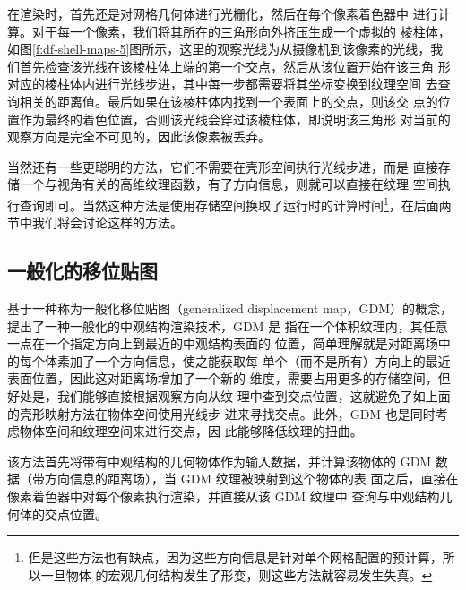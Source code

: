 在渲染时，首先还是对网格几何体进行光栅化，然后在每个像素着色器中 进行计算。对于每一个像素，我们将其所在的三角形向外挤压生成一个虚拟的 棱柱体，如图\ref{f:df-shell-maps-5}图所示，这里的观察光线为从摄像机到该像素的光线，我 们首先检查该光线在该棱柱体上端的第一个交点，然后从该位置开始在该三角 形对应的棱柱体内进行光线步进，其中每一步都需要将其坐标变换到纹理空间 去查询相关的距离值。最后如果在该棱柱体内找到一个表面上的交点，则该交 点的位置作为最终的着色位置，否则该光线会穿过该棱柱体，即说明该三角形 对当前的观察方向是完全不可见的，因此该像素被丢弃。

当然还有一些更聪明的方法，它们不需要在壳形空间执行光线步进，而是 直接存储一个与视角有关的高维纹理函数，有了方向信息，则就可以直接在纹理 空间执行查询即可。当然这种方法是使用存储空间换取了运行时的计算时间\footnote{但是这些方法也有缺点，因为这些方向信息是针对单个网格配置的预计算，所以一旦物体 的宏观几何结构发生了形变，则这些方法就容易发生失真。}，在后面两节中我们将会讨论这样的方法。



\subsection{一般化的移位贴图}
\cite{a:GeneralizedDisplacementMaps} 基于一种称为一般化移位贴图（generalized displacement map，GDM）的概念，提出了一种一般化的中观结构渲染技术，GDM 是 指在一个体积纹理内，其任意一点在一个指定方向上到最近的中观结构表面的 位置，简单理解就是对距离场中的每个体素加了一个方向信息，使之能获取每 单个（而不是所有）方向上的最近表面位置，因此这对距离场增加了一个新的 维度，需要占用更多的存储空间，但好处是，我们能够直接根据观察方向从纹 理中查到交点位置，这就避免了如上面的壳形映射方法在物体空间使用光线步 进来寻找交点。此外，GDM 也是同时考虑物体空间和纹理空间来进行交点，因 此能够降低纹理的扭曲。

该方法首先将带有中观结构的几何物体作为输入数据，并计算该物体的 GDM 数据（带方向信息的距离场），当 GDM 纹理被映射到这个物体的表 面之后，直接在像素着色器中对每个像素执行渲染，并直接从该 GDM 纹理中 查询与中观结构几何体的交点位置。

